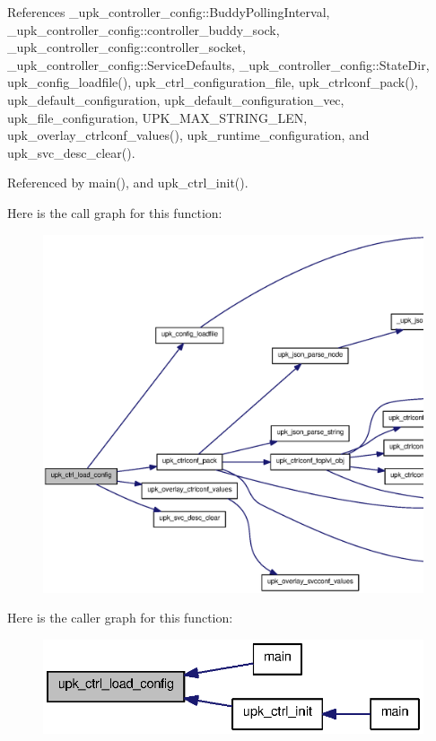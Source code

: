 References \_\-upk\_\-controller\_\-config::BuddyPollingInterval, \_\-upk\_\-controller\_\-config::controller\_\-buddy\_\-sock, \_\-upk\_\-controller\_\-config::controller\_\-socket, \_\-upk\_\-controller\_\-config::ServiceDefaults, \_\-upk\_\-controller\_\-config::StateDir, upk\_\-config\_\-loadfile(), upk\_\-ctrl\_\-configuration\_\-file, upk\_\-ctrlconf\_\-pack(), upk\_\-default\_\-configuration, upk\_\-default\_\-configuration\_\-vec, upk\_\-file\_\-configuration, UPK\_\-MAX\_\-STRING\_\-LEN, upk\_\-overlay\_\-ctrlconf\_\-values(), upk\_\-runtime\_\-configuration, and upk\_\-svc\_\-desc\_\-clear().



Referenced by main(), and upk\_\-ctrl\_\-init().



Here is the call graph for this function:\nopagebreak
\begin{figure}[H]
\begin{center}
\leavevmode
\includegraphics[width=400pt]{group__functions_ga11c5a55e854fb56c864a12ef5d314798_cgraph}
\end{center}
\end{figure}




Here is the caller graph for this function:\nopagebreak
\begin{figure}[H]
\begin{center}
\leavevmode
\includegraphics[width=330pt]{group__functions_ga11c5a55e854fb56c864a12ef5d314798_icgraph}
\end{center}
\end{figure}



